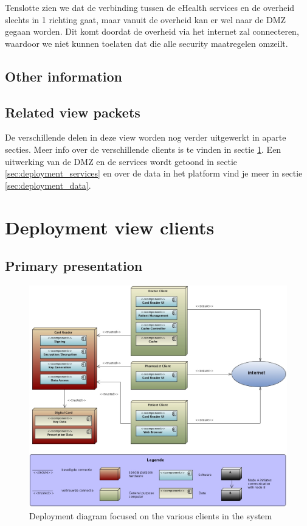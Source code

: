 \documentclass[a4paper,10pt]{article}
\begin{document}
Tenslotte zien we dat de verbinding tussen de eHealth services en de overheid slechts in 1 richting gaat, maar vanuit de overheid kan er wel naar de DMZ gegaan worden. Dit komt doordat de overheid via het internet zal connecteren, waardoor we niet kunnen toelaten dat die alle security maatregelen omzeilt.

\subsection{Other information}

\subsection{Related view packets}

De verschillende delen in deze view worden nog verder uitgewerkt in aparte secties. Meer info over de verschillende clients is te vinden in sectie \ref{sec:deployment_clients}. Een uitwerking van de DMZ en de services wordt getoond in sectie \ref{sec:deployment_services} en over de data in het platform vind je meer in sectie \ref{sec:deployment_data}.

\section{Deployment view clients}
\label{sec:deployment_clients}

\subsection{Primary presentation}
\begin{center}
    \begin{figure}[!h]
      \includegraphics[width=\textwidth]{../images/deployment_clients.jpg}
	\caption{Deployment diagram focused on the various clients in the system}
    \end{figure}
  \end{center}
\end{document}
